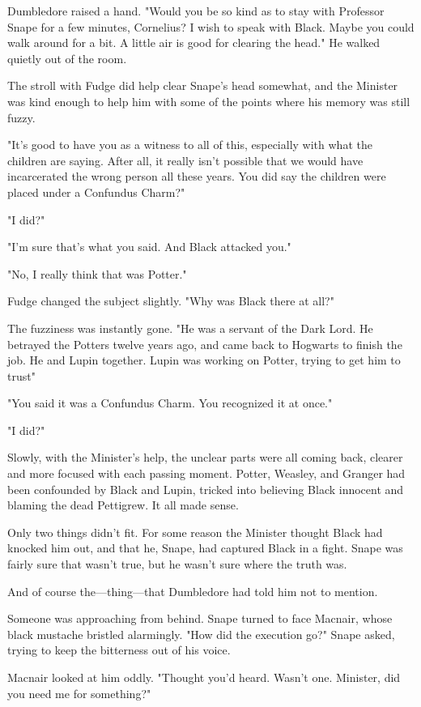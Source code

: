Dumbledore raised a hand. "Would you be so kind as to stay with Professor Snape for a few minutes, Cornelius? I wish to speak with Black. Maybe you could walk around for a bit. A little air is good for clearing the head." He walked quietly out of the room.

The stroll with Fudge did help clear Snape's head somewhat, and the Minister was kind enough to help him with some of the points where his memory was still fuzzy.

"It's good to have you as a witness to all of this, especially with what the children are saying. After all, it really isn't possible that we would have incarcerated the wrong person all these years. You did say the children were placed under a Confundus Charm?"

"I did?"

"I'm sure that's what you said. And Black attacked you."

"No, I really think that was Potter."

Fudge changed the subject slightly. "Why was Black there at all?"

The fuzziness was instantly gone. "He was a servant of the Dark Lord. He betrayed the Potters twelve years ago, and came back to Hogwarts to finish the job. He and Lupin together. Lupin was working on Potter, trying to get him to trust{\el}"

"You said it was a Confundus Charm. You recognized it at once."

"I did?"

Slowly, with the Minister's help, the unclear parts were all coming back, clearer and more focused with each passing moment. Potter, Weasley, and Granger had been confounded by Black and Lupin, tricked into believing Black innocent and blaming the dead Pettigrew. It all made sense.

Only two things didn't fit. For some reason the Minister thought Black had knocked him out, and that he, Snape, had captured Black in a fight. Snape was fairly sure that wasn't true, but he wasn't sure where the truth was.

And of course the—thing—that Dumbledore had told him not to mention.

Someone was approaching from behind. Snape turned to face Macnair, whose black mustache bristled alarmingly. "How did the execution go?" Snape asked, trying to keep the bitterness out of his voice.

Macnair looked at him oddly. "Thought you'd heard. Wasn't one. Minister, did you need me for something?"

